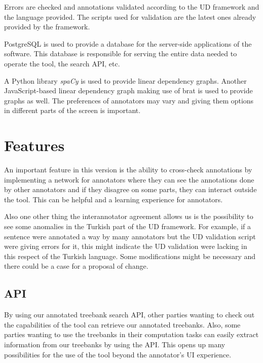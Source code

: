 \documentclass[
]{ceurart}
\begin{document}
Errors are checked and annotations validated according to the UD framework and the language provided.
The scripts used for validation are the latest ones already provided by the framework.\cite{UD-git}

PostgreSQL\cite{psql} is used to provide a database for the server-side applications of the software.
This database is responsible for serving the entire data needed to operate the tool, the search API, etc.

A Python library \textit{spaCy}\cite{spacy} is used to provide linear dependency graphs.
Another JavaScript-based linear dependency graph\cite{spyssalo} making use of brat\cite{brat-vis} is used to provide graphs as well.
The preferences of annotators may vary and giving them options in different parts of the screen is important.


\section{Features}
\label{sec:features}

An important feature in this version is the ability to cross-check annotations by implementing a network for annotators where they can see the annotations done by other annotators and if they disagree on some parts, they can interact outside the tool.
This can be helpful and a learning experience for annotators.

Also one other thing the interannotator agreement allows us is the possibility to see some anomalies in the Turkish part of the UD framework.
For example, if a sentence were annotated a way by many annotators but the UD validation script were giving errors for it, this might indicate the UD validation were lacking in this respect of the Turkish language.
Some modifications might be necessary and there could be a case for a proposal of change.

\subsection{API}
\label{sec:api}

By using our annotated treebank search API, other parties wanting to check out the capabilities of the tool can retrieve our annotated treebanks.
Also, some parties wanting to use the treebanks in their computation tasks can easily extract information from our treebanks by using the API.
This opens up many possibilities for the use of the tool beyond the annotator's UI experience.
\end{document}

